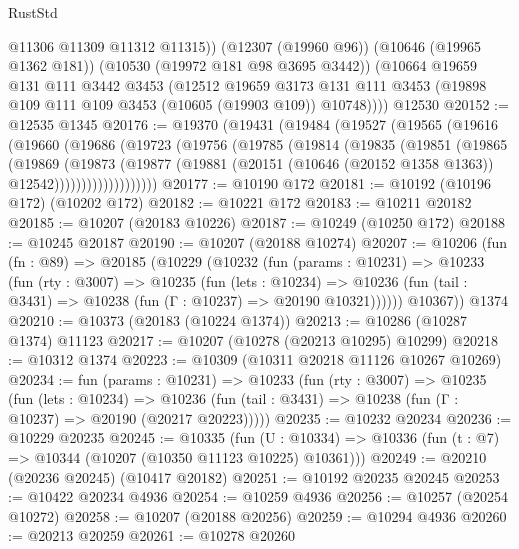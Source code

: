 \begin{lexlean}{RustStd}
\begin{coremodule}
          @11306
          @11309
          @11312
          @11315))
      (@12307 (@19960 @96))
      (@10646 (@19965 @1362 @181))
      (@10530 (@19972 @181 @98 @3695 @3442))
      (@10664
        @19659
        @131
        @111
        @3442
        @3453
        (@12512
          @19659
          @3173
          @131
          @111
          @3453
          (@19898 @109 @111 @109 @3453 (@10605 (@19903 @109)) @10748))))
    @12530
@20152 := @12535 @1345
@20176 := @19370
    (@19431
      (@19484
        (@19527
          (@19565
            (@19616
              (@19660
                (@19686
                  (@19723
                    (@19756
                      (@19785
                        (@19814
                          (@19835
                            (@19851
                              (@19865
                                (@19869
                                  (@19873
                                    (@19877
                                      (@19881
                                        (@20151
                                          (@10646 (@20152 @1358 @1363))
                                          @12542)))))))))))))))))))
@20177 := @10190 @172
@20181 := @10192 (@10196 @172) (@10202 @172)
@20182 := @10221 @172
@20183 := @10211 @20182
@20185 := @10207 (@20183 @10226)
@20187 := @10249 (@10250 @172)
@20188 := @10245 @20187
@20190 := @10207 (@20188 @10274)
@20207 := @10206
    (fun (fn : @89) =>
    @20185
      (@10229
        (@10232
          (fun (params : @10231) =>
          @10233
            (fun (rty : @3007) =>
            @10235
              (fun (lets : @10234) =>
              @10236 (fun (tail : @3431) => @10238 (fun (Γ : @10237) => @20190 @10321))))))
        @10367))
    @1374
@20210 := @10373 (@20183 (@10224 @1374))
@20213 := @10286 (@10287 @1374) @11123
@20217 := @10207 (@10278 (@20213 @10295) @10299)
@20218 := @10312 @1374
@20223 := @10309 (@10311 @20218 @11126 @10267 @10269)
@20234 := fun (params : @10231) =>
  @10233
    (fun (rty : @3007) =>
    @10235
      (fun (lets : @10234) =>
      @10236 (fun (tail : @3431) => @10238 (fun (Γ : @10237) => @20190 (@20217 @20223)))))
@20235 := @10232 @20234
@20236 := @10229 @20235
@20245 := @10335
    (fun (U : @10334) => @10336 (fun (t : @7) => @10344 (@10207 (@10350 @11123 @10225) @10361)))
@20249 := @20210 (@20236 @20245) (@10417 @20182)
@20251 := @10192 @20235 @20245
@20253 := @10422 @20234 @4936
@20254 := @10259 @4936
@20256 := @10257 (@20254 @10272)
@20258 := @10207 (@20188 @20256)
@20259 := @10294 @4936
@20260 := @20213 @20259
@20261 := @10278 @20260

\end{coremodule}
\end{lexlean}
